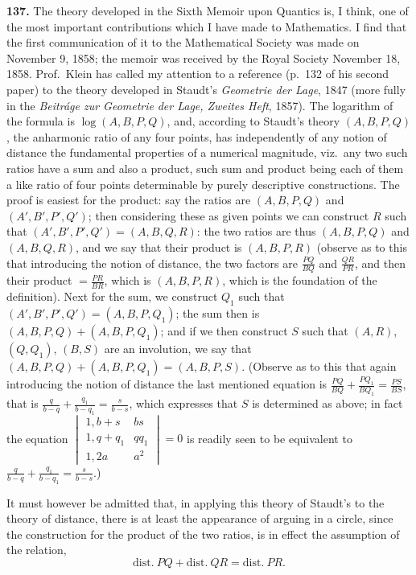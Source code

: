 \documentclass[11pt,a4paper]{article}
\begin{document}
\textbf{137.} The theory developed in the Sixth Memoir upon Quantics is, I think,
one of the most important contributions which I have made to Mathematics. I find
that the first communication of it to the Mathematical Society was made on November
9, 1858; the memoir was received by the Royal Society November 18, 1858. Prof.\ Klein
has called my attention to a reference (p.~132 of his second paper) to the theory
developed in Staudt's \textit{Geometrie der Lage}, 1847 (more fully in the \textit{Beitr\'{a}ge zur Geometrie}
\textit{der Lage, Zweites Heft}, 1857). The logarithm of the formula is $\log(A,B,P,Q)$, and,
according to Staudt's theory $(A,B,P,Q)$, the anharmonic ratio of any four points, has
independently of any notion of distance the fundamental properties of a numerical
magnitude, viz.\ any two such ratios have a sum and also a product, such sum and
product being each of them a like ratio of four points determinable by purely descriptive
constructions. The proof is easiest for the product: say the ratios are $(A,B,P,Q)$ and
$(A',B',P',Q')$; then considering these as given points we can construct $R$ such that
$(A',B',P',Q') = (A,B,Q,R)$: the two ratios are thus $(A,B,P,Q)$ and $(A,B,Q,R)$, and we
say that their product is $(A,B,P,R)$ (observe as to this that introducing the notion of
distance, the two factors are $\frac{PQ}{BQ}$ and $\frac{QR}{PR}$, and then their product $=\frac{PR}{BR}$, which is $(A,B,P,R)$,
which is the foundation of the definition). Next for the sum, we construct $Q_1$ such that
$(A',B',P',Q') = (A,B,P,Q_1)$; the sum then is $(A,B,P,Q)+(A,B,P,Q_1)$; and if we then
construct $S$ such that $(A,R)$, $(Q,Q_1)$, $(B,S)$ are an involution, we say that
$(A,B,P,Q)+(A,B,P,Q_1) = (A,B,P,S)$. (Observe as to this that again introducing the
notion of distance the last mentioned equation is $\frac{PQ}{BQ}+\frac{PQ_1}{BQ_1}=\frac{PS}{BS}$, that is
$\frac{q}{b-q}+\frac{q_1}{b-q_1}=\frac{s}{b-s}$, which expresses that $S$ is determined as above; in fact the equation
$\begin{vmatrix}1,b+s&bs\\1,q+q_1&qq_1\\1,2a&a^2\end{vmatrix}=0$ is readily seen to be equivalent to
$\frac{q}{b-q}+\frac{q_1}{b-q_1}=\frac{s}{b-s}$.)

It must however be admitted that, in applying this theory of Staudt's to the theory
of distance, there is at least the appearance of arguing in a circle, since the construction
for the product of the two ratios, is in effect the assumption of the relation,
\[
\text{dist.}\ PQ + \text{dist.}\ QR = \text{dist.}\ PR.
\]
\end{document}
